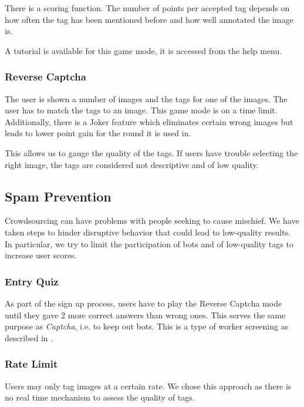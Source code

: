 There is a scoring function. The number of points per accepted tag depends on how often the tag has been mentioned before and how well annotated the image is.

A tutorial is available for this game mode, it is accessed from the help menu.

\subsubsection{Reverse Captcha}
\label{gacomphs19:sec:concepts:Gamemodes:reversecaptca}
The user is shown a number of images and the tags for one of the images. The user has to match the tags to an image.
This game mode is on a time limit. Additionally, there is a Joker feature which eliminates certain wrong images but leads to lower point gain for the round it is used in.

This allows us to gauge the quality of the tags. If users have trouble selecting the right image, the tags are considered not descriptive and of low quality.


\subsection{Spam Prevention}
\label{gacomphs19:sec:concepts:spamprevention}
Crowdsourcing can have problems with people seeking to cause mischief. We have taken steps to hinder disruptive behavior that could lead to low-quality results. In particular, we try to limit the participation of bots and  of low-quality tags to increase user scores.


\subsubsection{Entry Quiz}
\label{gacomphs19:sec:concepts:spamprevention:entryquiz}
As part of the sign up process, users have to play the Reverse Captcha mode until they gave 2 more correct answers than wrong ones. This serves the same purpose as \textit{Captcha}, i.e. to keep out bots. This is a type of worker screening as described in \cite{oleson2011programmatic}.


\subsubsection{Rate Limit}
\label{gacomphs19:sec:concepts:spamprevention:ratelimit}
Users may only tag images at a certain rate. We chose this approach as there is no real time mechanism to assess the quality of tags.


